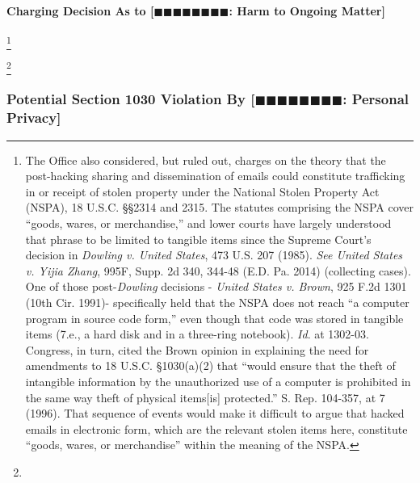 \paragraph{Charging Decision As to [$\blacksquare\blacksquare\blacksquare\blacksquare\blacksquare\blacksquare\blacksquare\blacksquare$: Harm to Ongoing Matter]}
\footnote{The Office also considered, but ruled out, charges on the theory that the post-hacking sharing and dissemination of emails could constitute trafficking in or receipt of stolen property under the National Stolen Property Act (NSPA), 18 U.S.C. \S\S 2314 and 2315.
The statutes comprising the NSPA cover “goods, wares, or merchandise,” and lower courts have largely understood that phrase to be limited to tangible items since the Supreme Court's decision in \textit{Dowling v. United States}, 473 U.S. 207 (1985).
\textit{See United States v. Yijia Zhang}, 995F, Supp. 2d 340, 344-48 (E.D. Pa. 2014) (collecting cases).
One of those post-\textit{Dowling} decisions - \textit{United States v. Brown}, 925 F.2d 1301 (10th Cir. 1991)- specifically held that the NSPA does not reach “a computer program in source code form,” even though that code was stored in tangible items (7.e., a hard disk and in a three-ring notebook).
\textit{Id}. at 1302-03.
Congress, in turn, cited the Brown opinion in explaining the need for amendments to 18 U.S.C. \S 1030(a)(2) that “would ensure that the theft of intangible information by the unauthorized use of a computer is prohibited in the same way theft of physical items[is] protected.”
S. Rep. 104-357, at 7 (1996).
That sequence of events would make it difficult to argue that hacked emails in electronic form, which are the relevant stolen items here, constitute “goods, wares, or merchandise” within the meaning of the NSPA.}




\footnote{}






\subsubsection{Potential Section 1030 Violation By [$\blacksquare\blacksquare\blacksquare\blacksquare\blacksquare\blacksquare\blacksquare\blacksquare$: Personal Privacy]}

